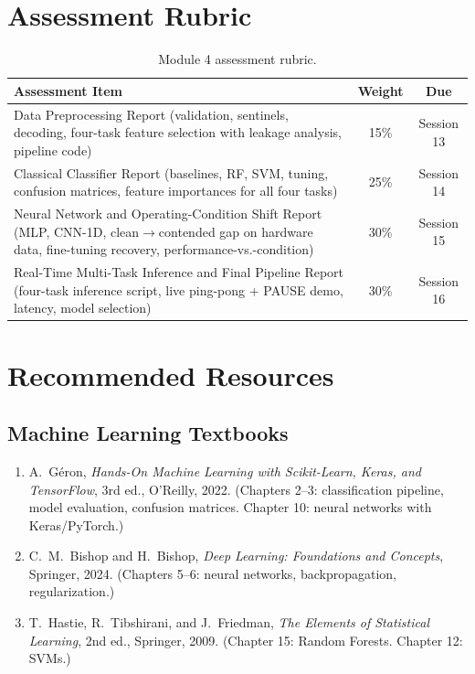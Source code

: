 \documentclass[11pt,letterpaper]{article}
\begin{document}
	\section{Assessment Rubric}

	\begin{table}[ht!]
		\centering
		\caption{Module 4 assessment rubric.}
		\label{tab:rubric}
		\renewcommand{\arraystretch}{1.3}
		\begin{tabularx}{\textwidth}{X c c}
			\toprule
			\textbf{Assessment Item} & \textbf{Weight} & \textbf{Due} \\
			\midrule
			Data Preprocessing Report (validation, sentinels, decoding, four-task feature selection with leakage analysis, pipeline code) & 15\% & Session 13 \\
			Classical Classifier Report (baselines, RF, SVM, tuning, confusion matrices, feature importances for all four tasks) & 25\% & Session 14 \\
			Neural Network and Operating-Condition Shift Report (MLP, CNN-1D, clean$\to$contended gap on hardware data, fine-tuning recovery, performance-vs.-condition) & 30\% & Session 15 \\
			Real-Time Multi-Task Inference and Final Pipeline Report (four-task inference script, live ping-pong + PAUSE demo, latency, model selection) & 30\% & Session 16 \\
			\bottomrule
		\end{tabularx}
	\end{table}

	\newpage
	\section{Recommended Resources}

	\subsection{Machine Learning Textbooks}

	\begin{enumerate}[leftmargin=2em]
		\item A.\ G\'eron, \textit{Hands-On Machine Learning with Scikit-Learn, Keras, and TensorFlow}, 3rd ed., O'Reilly, 2022. (Chapters 2--3: classification pipeline, model evaluation, confusion matrices. Chapter 10: neural networks with Keras/PyTorch.)
		\item C.\ M.\ Bishop and H.\ Bishop, \textit{Deep Learning: Foundations and Concepts}, Springer, 2024. (Chapters 5--6: neural networks, backpropagation, regularization.)
		\item T.\ Hastie, R.\ Tibshirani, and J.\ Friedman, \textit{The Elements of Statistical Learning}, 2nd ed., Springer, 2009. (Chapter 15: Random Forests. Chapter 12: SVMs.)
	\end{enumerate}
\end{document}
